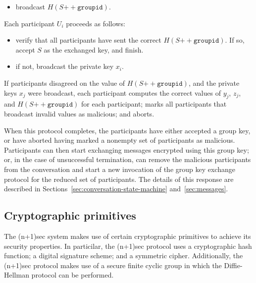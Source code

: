 \documentclass{article}
\def\concat{\mathbin{+\!\!\!+}}
\begin{document}
\begin{description}[noitemsep]
\begin{itemize}[noitemsep,nolistsep]
	\item broadcast $H(S \concat \texttt{groupid})$.
	\end{itemize}
\item[Round 4.] Each participant $U_i$ proceeds as follows:
	\begin{itemize}[noitemsep,nolistsep]\renewcommand{\labelitemi}{--}
	\item verify that all participants have sent the correct $H(S \concat \texttt{groupid})$. If so, accept $S$ as the exchanged key, and finish.
	\item if not, broadcast the private key $x_i$.
	\end{itemize}
\item[Aftermath.] If participants disagreed on the value of $H(S \concat \texttt{groupid})$, and the private keys $x_j$ were broadcast, each participant computes the correct values of $y_j$, $z_j$, and $H(S \concat \texttt{groupid})$ for each participant; marks all participants that broadcast invalid values as malicious; and aborts.
\end{description}

When this protocol completes, the participants have either accepted a group key, or have aborted having marked a nonempty set of participants as malicious.
Participants can then start exchanging messages encrypted using this group key; or, in the case of unsuccessful termination, can remove the malicious participants from the conversation and start a new invocation of the group key exchange protocol for the reduced set of participants.
The details of this response are described in Sections~\ref{sec:conversation-state-machine} and~\ref{sec:messages}.



\subsection{Cryptographic primitives}
\label{sec:cryptography/cryptographic-primitives}

The (n+1)sec system makes use of certain cryptographic primitives to achieve its security properties.
In particilar, the (n+1)sec protocol uses a cryptographic hash function; a digital signature scheme; and a symmetric cipher.
Additionally, the (n+1)sec protocol makes use of a secure finite cyclic group in which the Diffie-Hellman protocol can be performed.
\end{document}
